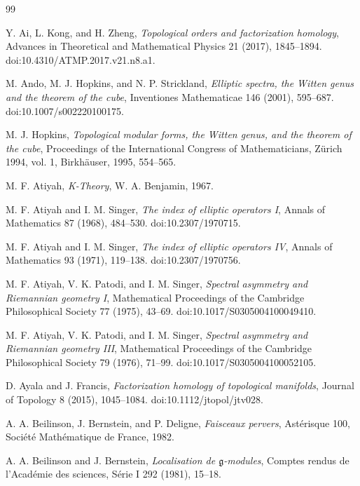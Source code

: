 \documentclass[11pt]{article}
\theoremstyle{definition}
\begin{document}
\begin{thebibliography}{99}

Y. Ai, L. Kong, and H. Zheng,
\emph{Topological orders and factorization homology},
Advances in Theoretical and Mathematical Physics 21 (2017), 1845--1894.
doi:10.4310/ATMP.2017.v21.n8.a1.

M. Ando, M. J. Hopkins, and N. P. Strickland,
\emph{Elliptic spectra, the Witten genus and the theorem of the cube},
Inventiones Mathematicae 146 (2001), 595--687.
doi:10.1007/s002220100175.

M. J. Hopkins,
\emph{Topological modular forms, the Witten genus, and the theorem of the
cube},
Proceedings of the International Congress of Mathematicians, Z\"urich 1994,
vol. 1, Birkh\"auser, 1995, 554--565.

M. F. Atiyah,
\emph{K-Theory},
W. A. Benjamin, 1967.

M. F. Atiyah and I. M. Singer,
\emph{The index of elliptic operators I},
Annals of Mathematics 87 (1968), 484--530.
doi:10.2307/1970715.

M. F. Atiyah and I. M. Singer,
\emph{The index of elliptic operators IV},
Annals of Mathematics 93 (1971), 119--138.
doi:10.2307/1970756.

M. F. Atiyah, V. K. Patodi, and I. M. Singer,
\emph{Spectral asymmetry and Riemannian geometry I},
Mathematical Proceedings of the Cambridge Philosophical Society 77
(1975), 43--69.
doi:10.1017/S0305004100049410.

M. F. Atiyah, V. K. Patodi, and I. M. Singer,
\emph{Spectral asymmetry and Riemannian geometry III},
Mathematical Proceedings of the Cambridge Philosophical Society 79
(1976), 71--99.
doi:10.1017/S0305004100052105.

D. Ayala and J. Francis,
\emph{Factorization homology of topological manifolds},
Journal of Topology 8 (2015), 1045--1084.
doi:10.1112/jtopol/jtv028.

A. A. Beilinson, J. Bernstein, and P. Deligne,
\emph{Faisceaux pervers},
Ast\'erisque 100, Soci\'et\'e Math\'ematique de France, 1982.

A. A. Beilinson and J. Bernstein,
\emph{Localisation de $\mathfrak g$-modules},
Comptes rendus de l'Acad\'emie des sciences, S\'erie I 292 (1981),
15--18.


\end{thebibliography}
\end{document}
